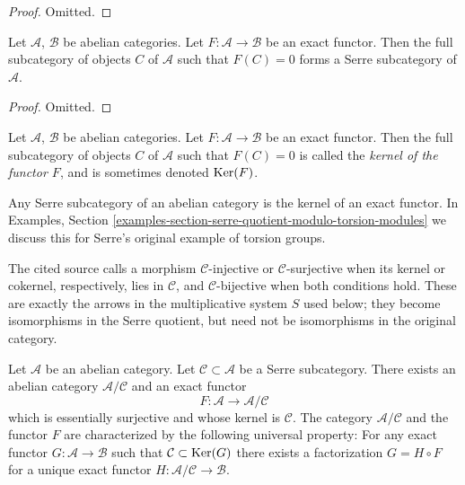 \begin{proof}
Omitted.
\end{proof}

\begin{lemma}
\label{lemma-kernel-exact-functor}
Let $\mathcal{A}$, $\mathcal{B}$ be abelian categories.
Let $F : \mathcal{A} \to \mathcal{B}$ be an exact functor.
Then the full subcategory of objects $C$ of $\mathcal{A}$
such that $F(C) = 0$ forms a Serre subcategory of $\mathcal{A}$.
\end{lemma}

\begin{proof}
Omitted.
\end{proof}

\begin{definition}
\label{definition-kernel-category}
Let $\mathcal{A}$, $\mathcal{B}$ be abelian categories.
Let $F : \mathcal{A} \to \mathcal{B}$ be an exact functor.
Then the full subcategory of objects $C$ of $\mathcal{A}$
such that $F(C) = 0$ is called the {\it kernel of the functor $F$},
and is sometimes denoted $\mathop{\mathrm{Ker}}(F)$.
\end{definition}

\noindent
Any Serre subcategory of an abelian category is the kernel of
an exact functor. In
Examples, Section \ref{examples-section-serre-quotient-modulo-torsion-modules}
we discuss this for Serre's original example of torsion groups.

\begin{lemma}
\label{lemma-serre-subcategory-is-kernel}
\begin{reference}
\cite[Chapter III, \S 2, no. 56, p. 249]{FAC}
\end{reference}
\begin{history}
The cited source calls a morphism $\mathcal{C}$-injective or
$\mathcal{C}$-surjective when its kernel or cokernel, respectively, lies in
$\mathcal{C}$, and $\mathcal{C}$-bijective when both conditions hold. These
are exactly the arrows in the multiplicative system $S$ used below; they
become isomorphisms in the Serre quotient, but need not be isomorphisms in
the original category.
\end{history}
Let $\mathcal{A}$ be an abelian category.
Let $\mathcal{C} \subset \mathcal{A}$ be a Serre subcategory.
There exists an abelian category $\mathcal{A}/\mathcal{C}$
and an exact functor
$$
F : \mathcal{A} \longrightarrow \mathcal{A}/\mathcal{C}
$$
which is essentially surjective and whose kernel is $\mathcal{C}$.
The category $\mathcal{A}/\mathcal{C}$ and the functor $F$ are
characterized by the following universal property: For any exact
functor $G : \mathcal{A} \to \mathcal{B}$ such that
$\mathcal{C} \subset \mathop{\mathrm{Ker}}(G)$ there exists a factorization
$G = H \circ F$ for a unique exact functor
$H : \mathcal{A}/\mathcal{C} \to \mathcal{B}$.
\end{lemma}


